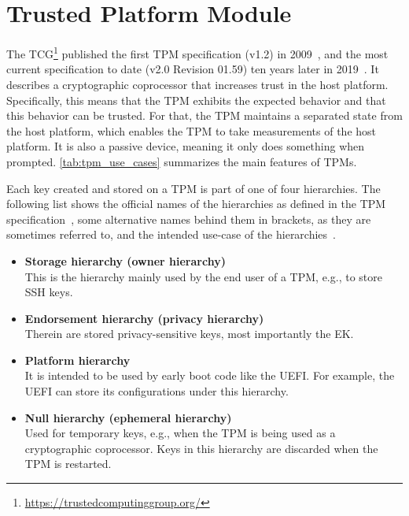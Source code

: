 \section{Trusted Platform Module}\label{sec:tpm}

The \ac{TCG}\footnote{\url{https://trustedcomputinggroup.org/}} published the first TPM specification (v1.2) in 2009~\cite{ISO11889}, and the most current specification to date (v2.0 Revision 01.59) ten years later in 2019~\cite{tpm}.
It describes a cryptographic coprocessor that increases trust in the host platform.
Specifically, this means that the TPM exhibits the expected behavior and that this behavior can be trusted.
For that, the TPM maintains a separated state from the host platform, which enables the TPM to take measurements of the host platform.
It is also a passive device, meaning it only does something when prompted.
\autoref{tab:tpm_use_cases} summarizes the main features of TPMs.



Each key created and stored on a TPM is part of one of four hierarchies.
The following list shows the official names of the hierarchies as defined in the TPM specification~\cite{tpm}, some alternative names behind them in brackets, as they are sometimes referred to, and the intended use-case of the hierarchies~\cite{Arthur2015}.
\begin{itemize}

  \item{\textbf{Storage hierarchy (owner hierarchy)}\\
  This is the hierarchy mainly used by the end user of a TPM, e.g., to store SSH keys.}

  \item{\textbf{Endorsement hierarchy (privacy hierarchy)}\\
  Therein are stored privacy-sensitive keys, most importantly the EK.}

  \item{\textbf{Platform hierarchy}\\
  It is intended to be used by early boot code like the UEFI\@.
  For example, the UEFI can store its configurations under this hierarchy.}

  \item{\textbf{Null hierarchy (ephemeral hierarchy)}\\
  Used for temporary keys, e.g., when the TPM is being used as a cryptographic coprocessor.
  Keys in this hierarchy are discarded when the TPM is restarted.}

\end{itemize}


